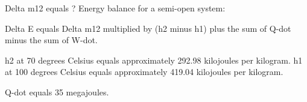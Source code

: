 Delta m12 equals ?  
Energy balance for a semi-open system:  

Delta E equals Delta m12 multiplied by (h2 minus h1) plus the sum of Q-dot minus the sum of W-dot.  

h2 at 70 degrees Celsius equals approximately 292.98 kilojoules per kilogram.  
h1 at 100 degrees Celsius equals approximately 419.04 kilojoules per kilogram.  

Q-dot equals 35 megajoules.